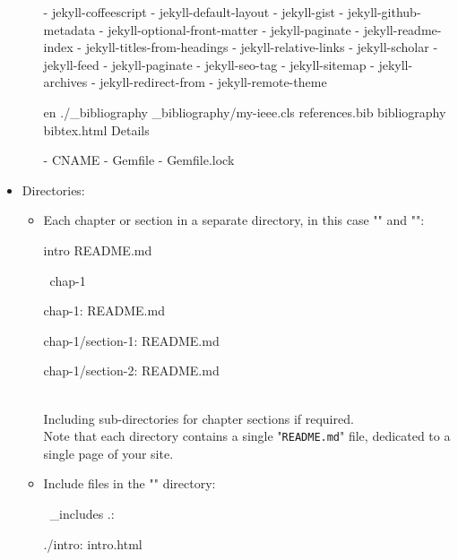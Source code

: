 \begin{itemize}
\begin{itemize}
{{\begin{scriptii}
  - jekyll-coffeescript
  - jekyll-default-layout
  - jekyll-gist
  - jekyll-github-metadata
  - jekyll-optional-front-matter
  - jekyll-paginate
  - jekyll-readme-index
  - jekyll-titles-from-headings
  - jekyll-relative-links
  - jekyll-scholar
  - jekyll-feed
  - jekyll-paginate
  - jekyll-seo-tag
  - jekyll-sitemap
  - jekyll-archives
  - jekyll-redirect-from
  - jekyll-remote-theme

   en
   ./\_bibliography
   \_bibliography/my-ieee.cls
   references.bib
   
   
      
   
      bibliography
   bibtex.html
     Details
   

  - CNAME
  - Gemfile
  - Gemfile.lock
\end{scriptii}
}}
\end{itemize}
\item Directories:
\begin{itemize}
\item Each chapter or section in a separate directory, in this case "" and "":
\vspace{-0.25cm}
{\footnotesize{
\begin{scriptii}
  intro
README.md

 \lsr\ chap-1

chap-1:
README.md    

chap-1/section-1:
README.md

chap-1/section-2:
README.md
\end{scriptii}
}}\\[-0.5cm]
\noindent Including sub-directories for chapter sections if required. \\
Note that each directory contains a single "\texttt{README.md}" file, dedicated to a single page of your site. \\[0.25cm]
\item Include files in the "" directory:
{\footnotesize{
\begin{scriptii}
 \lsr\ \_includes
.:
  

./intro:
intro.html


\end{scriptii}}}
\end{itemize}
\end{itemize}
